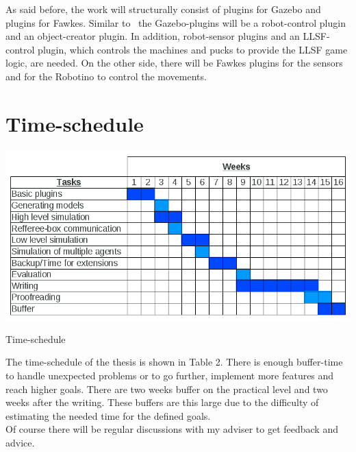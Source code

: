 \documentclass[11pt,a4paper,titlepage]{article}
\begin{document}
As said before, the work will structurally consist of plugins for Gazebo and plugins for Fawkes. Similar to~\cite{KlingenDA} the Gazebo-plugins will be a robot-control plugin and an object-creator plugin. In addition, robot-sensor plugins and an LLSF-control plugin, which controls the machines and pucks to provide the LLSF game logic,  are needed. On the other side, there will be Fawkes plugins  for the sensors and for the Robotino to control the movements.

\section{Time-schedule}

\begin{table}
\includegraphics[scale=0.43]{pics/Schedule.png}
\label{Table 2}
\caption{Time-schedule}
\end{table}

The time-schedule of the thesis is shown in Table 2. There is enough buffer-time to handle unexpected problems or to go further, implement more features and reach higher goals. There are two weeks buffer on the practical level and two weeks after the writing. These buffers are this large due to the difficulty of estimating the needed time for the defined goals.\\
Of course there will be regular discussions with my adviser to get feedback and advice.
\end{document}
